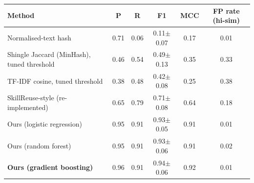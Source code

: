\begin{tabular}{lccccc}
\toprule
Method & P & R & F1 & MCC & FP rate (hi-sim) \\
\midrule
Normalised-text hash & 0.71 & 0.06 & 0.11$\pm$0.07 & 0.17 & 0.01 \\
Shingle Jaccard (MinHash), tuned threshold & 0.46 & 0.54 & 0.49$\pm$0.13 & 0.35 & 0.33 \\
TF-IDF cosine, tuned threshold & 0.38 & 0.48 & 0.42$\pm$0.08 & 0.25 & 0.38 \\
SkillReuse-style (re-implemented) & 0.65 & 0.79 & 0.71$\pm$0.08 & 0.64 & 0.18 \\
\midrule
Ours (logistic regression) & 0.95 & 0.91 & 0.93$\pm$0.05 & 0.91 & 0.01 \\
Ours (random forest) & 0.95 & 0.91 & 0.93$\pm$0.06 & 0.91 & 0.02 \\
\textbf{Ours (gradient boosting)} & 0.96 & 0.91 & 0.94$\pm$0.06 & 0.92 & 0.01 \\
\bottomrule
\end{tabular}
